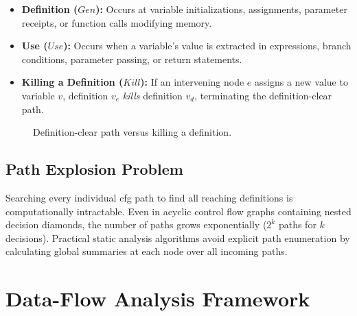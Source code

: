 \begin{itemize}
    \item \textbf{Definition ($Gen$):} Occurs at variable initializations, assignments, parameter receipts, or function calls modifying memory.
    \item \textbf{Use ($Use$):} Occurs when a variable's value is extracted in expressions, branch conditions, parameter passing, or return statements.
    \item \textbf{Killing a Definition ($Kill$):} If an intervening node $e$ assigns a new value to variable $v$, definition $v_e$ \textit{kills} definition $v_d$, terminating the definition-clear path.
\end{itemize}

\begin{figure}[htpb]
\centering
{}
\caption{Definition-clear path versus killing a definition.}
\label{fig:def-clear-kill}
\end{figure}

\subsection{Path Explosion Problem}
Searching every individual \gls{cfg} path to find all reaching definitions is computationally intractable. Even in acyclic control flow graphs containing nested decision diamonds, the number of paths grows exponentially ($2^k$ paths for $k$ decisions). Practical static analysis algorithms avoid explicit path enumeration by calculating global summaries at each node over all incoming paths.

\section{Data-Flow Analysis Framework}
\label{sec:df_framework}

